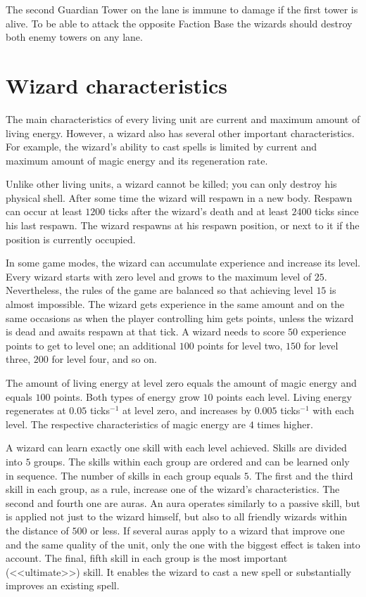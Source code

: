 The second Guardian Tower on the lane is immune to damage if the first tower is alive. To be able to attack the opposite Faction Base the
wizards should destroy both enemy towers on any lane.

\section{Wizard characteristics}
 
The main characteristics of every living unit are current and maximum amount of living energy. However, a wizard also has several
other important characteristics. For example, the wizard’s ability to cast spells is limited by current and maximum amount
of magic energy and its regeneration rate.
 
Unlike other living units, a wizard cannot be killed; you can only destroy his physical shell. After some
time the wizard will respawn in a new body. Respawn can occur at least $1200$ ticks after the wizard’s death and at least $2400$ ticks since
his last respawn. The wizard respawns at his respawn position, or next to it if the position is currently occupied.
 
In some game modes, the wizard can accumulate experience and increase its level. Every wizard starts with zero level and
grows to the maximum level of $25$. Nevertheless, the rules of the game are balanced so that achieving level $15$ is almost impossible.
The wizard gets experience in the same amount and on the same occasions as when the player controlling him gets points, unless
the wizard is dead and awaits respawn at that tick. A wizard needs to score $50$ experience points to get to level one; an additional $100$ points
for level two, $150$ for level three, $200$ for level four, and so on.
 
The amount of living energy at level zero equals the amount of magic energy and equals $100$ points. Both types of energy grow
$10$ points each level. Living energy regenerates at $0.05$ ticks$^{-1}$ at level zero, and increases
by $0.005$ ticks$^{-1}$ with each level. The respective characteristics of magic energy are $4$ times higher.
 
A wizard can learn exactly one skill with each level achieved. Skills are divided into $5$ groups. The skills within each group
are ordered and can be learned only in sequence. The number of skills in each group equals $5$. The first and the third skill in each group, as
a rule, increase one of the wizard’s characteristics. The second and fourth one are auras. An aura operates similarly to a
passive skill, but is applied not just to the wizard himself, but also to all friendly wizards within the distance of
$500$ or less. If several auras apply to a wizard that improve one and the same quality of the unit, only
the one with the biggest effect is taken into account. The final, fifth skill in each group is the most important (<<ultimate>>) skill. It
enables the wizard to cast a new spell or substantially improves an existing spell.

